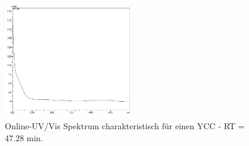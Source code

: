 \begin{figure}[!htbp]
  \centering
  \includegraphics[width=0.5\textwidth]{figures/Kapitel6/Reaktion3h/YCC4728.png}
  \caption{}
  \label{fig:YCC4728}
  \caption[Online-UV/Vis Spektren mit der Charakteristik eines YCC bei 47.28 min., Quelle: Autor]{Online-UV/Vis Spektrum charakteristisch für einen  \gls{YCC} - RT = 47.28 min.}
\end{figure}

